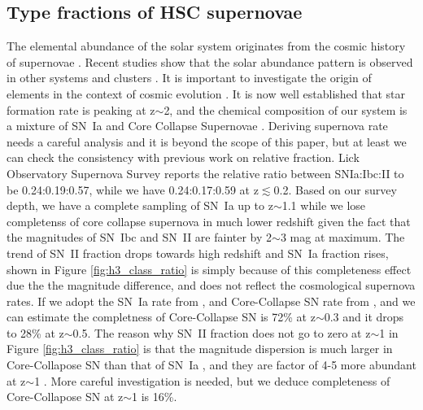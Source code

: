 \documentclass[useamsfonts]{pasj01}
\begin{document}
\subsection{Type fractions of HSC supernovae}
The elemental abundance of the solar system \citep{grevesse98a} originates from the cosmic history of 
supernovae \citep{maraston05a,kobayashi00a}.  
Recent studies show that the solar abundance pattern is observed in other systems \citep{ramirez09a}
and clusters \citep{mernier18a}.  It is important to investigate the origin of elements in the context
of cosmic evolution \citep{fukugita04}. 
It is now well established that star formation rate is peaking at z$\sim$2, and the chemical composition
of our system is a mixture of SN~Ia and Core Collapse Supernovae \citep{tsujimoto95a,kobayashi11a}.
Deriving supernova rate needs a careful analysis \citep{dilday08a,brown19a,frohmaier19a} and it is beyond the scope 
of this paper, but at least we can check the consistency with previous work on relative fraction.
Lick Observatory Supernova Survey \citep{li11a} reports the relative ratio between SNIa:Ibc:II to 
be 0.24:0.19:0.57, while we have 0.24:0.17:0.59 at z$\lesssim$0.2. 
Based on our survey depth, we have a complete sampling of SN~Ia up to z$\sim$1.1 while we lose
completenss of core collapse supernova in much lower redshift given the fact that the magnitudes of
SN~Ibc and SN~II are fainter by 2$\sim$3 mag at maximum.
The trend of SN~II fraction drops towards high redshift and SN~Ia fraction rises, shown in 
Figure \ref{fig:h3_class_ratio} is simply because of 
this completeness effect due the the magnitude difference, and does not reflect the cosmological 
supernova rates.
If we adopt the SN~Ia rate from \citet{graur14a}, and Core-Collapse SN rate from \citet{strolger15a},
and we can estimate the completness of Core-Collapse SN is 72\% at z$\sim$0.3 and it drops to 28\% at
z$\sim$0.5. 
The reason why SN~II fraction does not go to zero at z$\sim$1 in Figure \ref{fig:h3_class_ratio} is 
that the magnitude dispersion is much larger in Core-Collapose SN \citep[$\sigma$ $\sim$ 1.2 mag]{li11a,kessler19b} 
than that of SN~Ia \citep[$\sigma$ $\sim$ 0.5 mag]{rubin15a}, and they are factor of 4-5 more abundant 
at z$\sim$1 \citep{madau98a,hounsell18a}. 
More careful investigation is needed, but we deduce completeness of Core-Collapose SN at z$\sim$1 
is 16\%.

\end{document}
